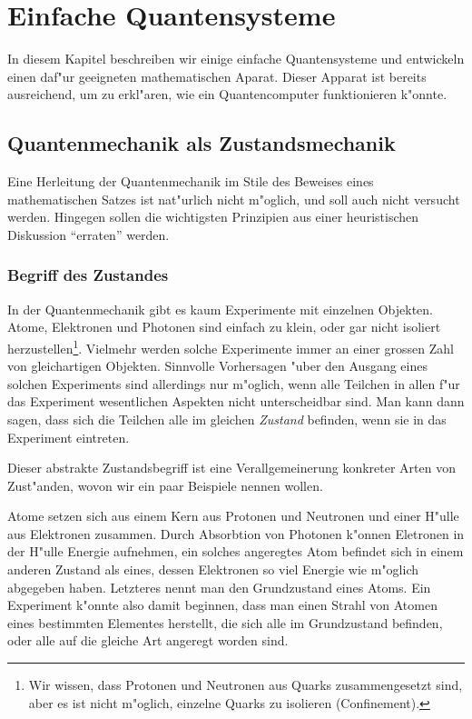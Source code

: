 \chapter{Einfache Quantensysteme\label{chapter:einfache-quantensysteme}}
\rhead{}
In diesem Kapitel beschreiben wir einige einfache Quantensysteme und
entwickeln einen daf"ur geeigneten mathematischen Aparat. Dieser
Apparat ist bereits ausreichend, um zu erkl"aren, wie ein Quantencomputer
funktionieren k"onnte.

\section{Quantenmechanik als Zustandsmechanik}
Eine Herleitung der Quantenmechanik im Stile des Beweises eines mathematischen
Satzes ist nat"urlich nicht m"oglich, und soll auch nicht versucht werden.
Hingegen sollen die wichtigsten Prinzipien aus einer heuristischen
Diskussion ``erraten'' werden. 

\subsection{Begriff des Zustandes}
In der Quantenmechanik gibt es kaum Experimente mit einzelnen Objekten.
Atome, Elektronen und Photonen sind einfach zu klein, oder gar nicht
isoliert herzustellen\footnote{Wir wissen, dass Protonen und Neutronen aus
Quarks zusammengesetzt sind, aber es ist nicht m"oglich, einzelne Quarks
zu isolieren (Confinement).}.
Vielmehr werden solche Experimente immer
an einer grossen Zahl von gleichartigen Objekten.
Sinnvolle Vorhersagen "uber den Ausgang eines solchen Experiments
sind allerdings nur m"oglich, wenn alle
Teilchen in allen f"ur das Experiment wesentlichen Aspekten
nicht unterscheidbar sind. Man kann dann sagen, dass sich die
Teilchen alle im gleichen {\em Zustand} befinden, wenn sie in
das Experiment eintreten.

Dieser abstrakte Zustandsbegriff ist eine Verallgemeinerung konkreter
Arten von Zust"anden, wovon wir ein paar Beispiele nennen wollen.

Atome setzen sich aus einem Kern aus Protonen und Neutronen und einer
H"ulle aus Elektronen zusammen.
Durch Absorbtion von Photonen k"onnen Eletronen in der H"ulle Energie
aufnehmen, ein solches angeregtes Atom befindet sich in einem anderen
Zustand als eines, dessen Elektronen so viel Energie wie m"oglich
abgegeben haben.
Letzteres nennt man den Grundzustand eines Atoms.
Ein Experiment k"onnte also damit beginnen,
dass man einen Strahl von Atomen eines bestimmten Elementes herstellt,
die sich alle im Grundzustand befinden, oder alle auf die gleiche Art
angeregt worden sind.

